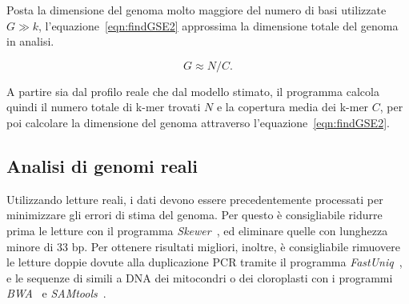 \documentclass[crop=false, class=book]{standalone}
\begin{document}
	
	Posta la dimensione del genoma molto maggiore del numero di basi utilizzate $G\gg k$, l'equazione~\vref{eqn:findGSE2} approssima la dimensione totale del genoma in analisi.
	
	\begin{equation}
		\label{eqn:findGSE2}
		G\approx N/C.
	\end{equation}

	A partire sia dal profilo reale che dal modello stimato, il programma calcola quindi il numero totale di k-mer trovati $N$ e la copertura media dei k-mer $C$, per poi calcolare la dimensione del genoma attraverso l'equazione~\vref{eqn:findGSE2}.
	
	
	\subsection{Analisi di genomi reali}
	Utilizzando letture reali, i dati devono essere precedentemente processati per minimizzare gli errori di stima del genoma. Per questo è consigliabile ridurre prima le letture con il programma \textit{Skewer}~\cite{jiang2014skewer}, ed eliminare quelle con lunghezza minore di 33 bp. Per ottenere risultati migliori, inoltre, è consigliabile rimuovere le letture doppie dovute alla duplicazione PCR tramite il programma \textit{FastUniq}~\cite{xu2012fastuniq}, e le sequenze di simili a DNA dei mitocondri o dei cloroplasti con i programmi \textit{BWA}~\cite{li2009fast} e \textit{SAMtools}~\cite{li2009sequence}.
\end{document}
